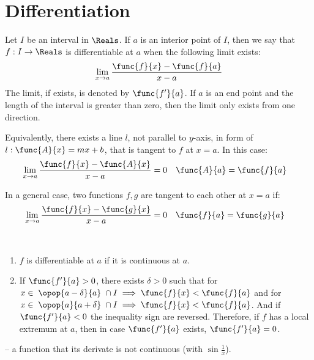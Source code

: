 \chapter{Differentiation}
\thispagestyle{headings}

\begin{definition}
    Let \(I\) be an interval in \(\Reals\). If \(a\) is an interior point of \(I\), then we say that \(f: I \to \Reals\) is differentiable at \(a\) when the following limit exists:
    \begin{equation*}
        \lim_{x \to a} \dfrac{\func{f}{x} - \func{f}{a}}{x - a}
    \end{equation*}
    The limit, if exists, is denoted by \(\func{f'}{a}\).
    If \(a\) is an end point and the length of the interval is greater than zero, then the limit only exists from one direction.

    Equivalently, there exists a line \(l\), not parallel to \(y\)-axis, in form of \(l : \func{A}{x} = mx + b\), that is tangent to \(f\) at \(x = a\). In this case:
    \begin{align*}
        \lim_{x \to a}\dfrac{\func{f}{x} - \func{A}{x}}{x - a } & = 0 & \func{A}{a} & = \func{f}{a}
    \end{align*}
\end{definition}
In a general case, two functions \(f,g\) are tangent to each other at \(x = a\) if:
\begin{align}
    \lim_{x \to a} \dfrac{\func{f}{x} - \func{g}{x}}{x - a} & = 0 & \func{f}{a} & = \func{g}{a}
\end{align}
\begin{corollary}\
    \begin{enumerate}
        \item \(f\) is differentiable at \(a\) if it is continuous at \(a\).
        \item \label{extrma} If \(\func{f'}{a} > 0\), there exists \(\delta > 0\) such that for \(x \in \; \opop{a- \delta}{a} \; \cap I \implies \func{f}{x} < \func{f}{a} \) and for \(x \in \; \opop{a}{ a +  \delta}\; \cap I \implies \func{f}{x} < \func{f}{a}\). And if \(\func{f'}{a} < 0\) the inequality sign are reversed. Therefore, if \(f\) has a local extremum at \(a\), then in case \(\func{f'}{a}\) exists, \(\func{f'}{a} = 0\).
    \end{enumerate}
\end{corollary}
\begin{example}
    -- a function that its derivate is not continuous (with \(\sin\frac{1}{x}\)).
\end{example}
